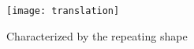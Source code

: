 \begin{figure}
\centering
\texttt{[image: translation]}
\caption{Characterized by the repeating shape}
\label{trans}
\end{figure}